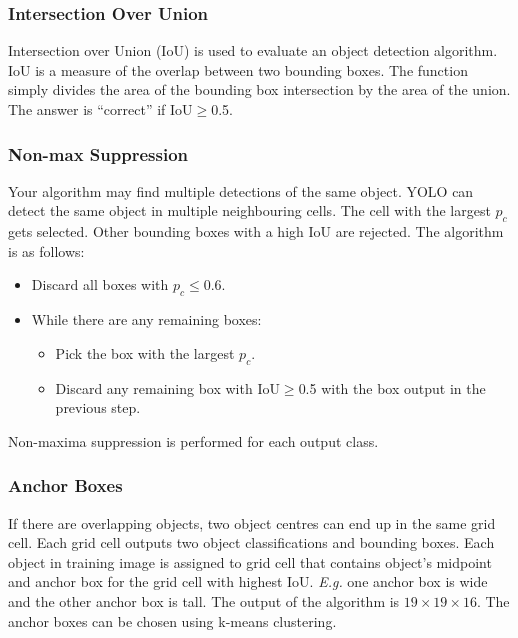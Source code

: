 \documentclass{article}
\begin{document}
\subsubsection{Intersection Over Union}
Intersection over Union (IoU) is used to evaluate an object detection algorithm.
IoU is a measure of the overlap between two bounding boxes.
The function simply divides the area of the bounding box intersection by the area of the union.
The answer is ``correct'' if IoU$\ge$0.5.

\subsubsection{Non-max Suppression}\label{cha:nonmax}
Your algorithm may find multiple detections of the same object.
YOLO can detect the same object in multiple neighbouring cells.
The cell with the largest $p_c$ gets selected. Other bounding boxes with a high IoU are rejected.
The algorithm is as follows:
\begin{itemize}
  \item Discard all boxes with $p_c\le 0.6$.
  \item While there are any remaining boxes:
    \begin{itemize}
      \item Pick the box with the largest $p_c$.
      \item Discard any remaining box with IoU$\ge$0.5 with the box output in the previous step.
    \end{itemize}
\end{itemize}
Non-maxima suppression is performed for each output class.

\subsubsection{Anchor Boxes}
If there are overlapping objects, two object centres can end up in the same grid cell.
Each grid cell outputs two object classifications and bounding boxes.
Each object in training image is assigned to grid cell that contains object's midpoint and anchor box for the grid cell with highest IoU.
\emph{E.g.} one anchor box is wide and the other anchor box is tall.
The output of the algorithm is $19\times 19\times 16$.
The anchor boxes can be chosen using k-means clustering.
\end{document}
